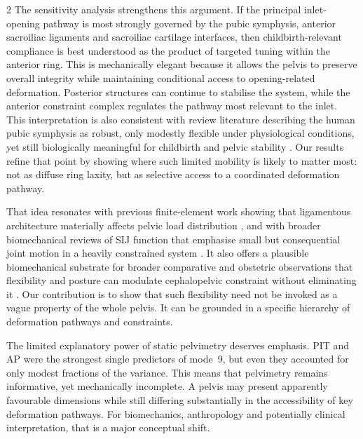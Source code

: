 \documentclass[openacc]{rsproca_new}
\begin{document}
\begin{multicols}{2}
The sensitivity analysis strengthens this argument. If the principal inlet-opening pathway is most strongly governed by the pubic symphysis, anterior sacroiliac ligaments and sacroiliac cartilage interfaces, then childbirth-relevant compliance is best understood as the product of targeted tuning within the anterior ring. This is mechanically elegant because it allows the pelvis to preserve overall integrity while maintaining conditional access to opening-related deformation. Posterior structures can continue to stabilise the system, while the anterior constraint complex regulates the pathway most relevant to the inlet. This interpretation is also consistent with review literature describing the human pubic symphysis as robust, only modestly flexible under physiological conditions, yet still biologically meaningful for childbirth and pelvic stability \cite{Grunstra2019,Stolarczyk2021}. Our results refine that point by showing where such limited mobility is likely to matter most: not as diffuse ring laxity, but as selective access to a coordinated deformation pathway.

That idea resonates with previous finite-element work showing that ligamentous architecture materially affects pelvic load distribution \cite{Eichenseer2011,Hammer2013}, and with broader biomechanical reviews of SIJ function that emphasise small but consequential joint motion in a heavily constrained system \cite{Vleeming2012,Kiapour2019,ChoKwak2020}. It also offers a plausible biomechanical substrate for broader comparative and obstetric observations that flexibility and posture can modulate cephalopelvic constraint without eliminating it \cite{Pink2024,Fremondiere2022}. Our contribution is to show that such flexibility need not be invoked as a vague property of the whole pelvis. It can be grounded in a specific hierarchy of deformation pathways and constraints.

The limited explanatory power of static pelvimetry deserves emphasis. PIT and AP were the strongest single predictors of mode~9, but even they accounted for only modest fractions of the variance. This means that pelvimetry remains informative, yet mechanically incomplete. A pelvis may present apparently favourable dimensions while still differing substantially in the accessibility of key deformation pathways. For biomechanics, anthropology and potentially clinical interpretation, that is a major conceptual shift.


\end{multicols}
\end{document}
